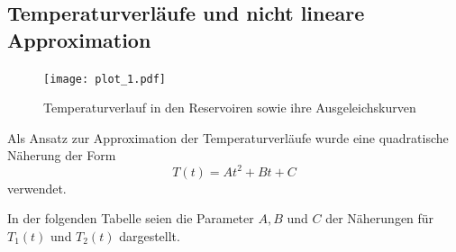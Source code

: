 
\subsection{Temperaturverläufe und nicht lineare Approximation}

\begin{figure}[H]
  \centering
  \texttt{[image: plot\_1.pdf]}
  \caption{Temperaturverlauf in den Reservoiren sowie ihre Ausgeleichskurven}
  \label{fig:plot1}
\end{figure}

Als Ansatz zur Approximation der Temperaturverläufe wurde eine quadratische Näherung der Form 
\begin{equation}
  T(t)=At^2+Bt+C
\end{equation}
verwendet.

\noindent In der folgenden Tabelle seien die Parameter $A, B$ und $C$ der Näherungen für $T_1(t)$ und $T_2(t)$ dargestellt.

